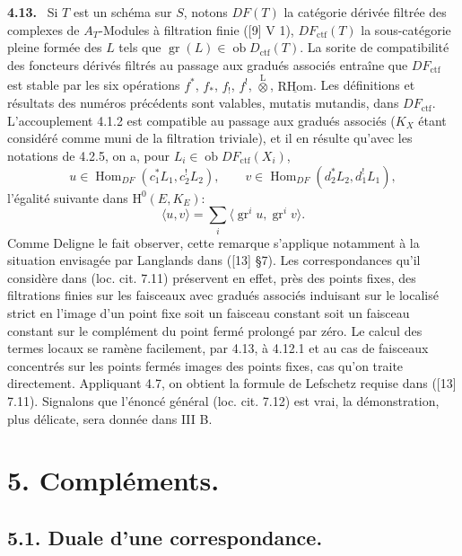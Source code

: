 \documentclass[11pt]{article}
\newenvironment{statement}[1]{\par\medskip\noindent\textbf{#1.}\ }{\par\medskip}
\renewcommand{\H}{\mathrm{H}}
\DeclareMathOperator{\Hom}{Hom}
\newcommand{\R}{\mathrm{R}}\newcommand{\RHomCore}{\mathrm{RHom}}
\newcommand{\ob}{\operatorname{ob}}
\providecommand{\RHom}{\RHomCore}
\providecommand{\uRHom}{\underline{\RHom}}
\providecommand{\Dctf}{D_{\mathrm{ctf}}}
\providecommand{\ctf}{\mathrm{ctf}}
\providecommand{\gr}{\operatorname{gr}}
\providecommand{\Dctf}{D_{\mathrm{ctf}}}
\providecommand{\RHom}{\RHomCore}
\providecommand{\Hom}{\operatorname{Hom}}
\providecommand{\ob}{\operatorname{ob}}
\providecommand{\gr}{\operatorname{gr}}
\providecommand{\gr}{\operatorname{gr}}
\providecommand{\RHom}{\R\mathcal{H}om}
\providecommand{\R}{\mathrm R}
\providecommand{\RHom}{\RHomCore}
\providecommand{\Hom}{\operatorname{Hom}}
\begin{document}
\begin{statement}{4.13}
Si $T$ est un schéma sur $S$, notons $DF(T)$ la catégorie dérivée filtrée des complexes de $A_T$-Modules à filtration finie ([9] V 1), $DF_{\ctf}(T)$ la sous-catégorie pleine formée des $L$ tels que $\gr(L)\in\ob\Dctf(T)$. La sorite de compatibilité des foncteurs dérivés filtrés au passage aux gradués associés entraîne que $DF_{\ctf}$ est stable par les six opérations $f^*$, $f_*$, $f_!$, $f^!$, $\overset{\mathrm{L}}{\otimes}$, $\uRHom$. Les définitions et résultats des numéros précédents sont valables, mutatis mutandis, dans $DF_{\ctf}$. L'accouplement 4.1.2 est compatible au passage aux gradués associés ($K_X$ étant considéré comme muni de la filtration triviale), et il en résulte qu'avec les notations de 4.2.5, on a, pour $L_i\in\ob DF_{\ctf}(X_i)$,
\[
u\in\Hom_{DF}(c_1^*L_1,c_2^!L_2),\qquad
v\in\Hom_{DF}(d_2^*L_2,d_1^!L_1),
\]
l'égalité suivante dans $\H^0(E,K_E)$:
\begin{equation}
\tag{4.13.1}
\langle u,v\rangle=\sum_i\langle \gr^i u,\gr^i v\rangle.
\end{equation}
Comme Deligne le fait observer, cette remarque s'applique notamment à la situation envisagée par Langlands dans ([13] §7). Les correspondances qu'il considère dans (loc. cit. 7.11) préservent en effet, près des points fixes, des filtrations finies sur les faisceaux avec gradués associés induisant sur le localisé strict en l'image d'un point fixe soit un faisceau constant soit un faisceau constant sur le complément du point fermé prolongé par zéro. Le calcul des termes locaux se ramène facilement, par 4.13, à 4.12.1 et au cas de faisceaux concentrés sur les points fermés images des points fixes, cas qu'on traite directement. Appliquant 4.7, on obtient la formule de Lefschetz requise dans ([13] 7.11). Signalons que l'énoncé général (loc. cit. 7.12) est vrai, la démonstration, plus délicate, sera donnée dans III B.
\end{statement}



\section*{5. Compléments.}

\subsection*{5.1. Duale d'une correspondance.}
\end{document}
